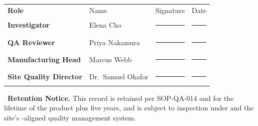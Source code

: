 \begin{center}
\begin{tabularx}{\linewidth}{@{}>{\bfseries}p{3.2cm} p{3.4cm} p{4.4cm} X@{}}
\rowcolor{meridiannavy}
{\color{white}Role} & {\color{white}Name} & {\color{white}Signature} & {\color{white}Date} \\
Investigator & Elena Cho & \rule{3.2cm}{0.4pt} & \rule{2cm}{0.4pt} \\
\rowcolor{meridianpaper}
QA Reviewer & Priya Nakamura & \rule{3.2cm}{0.4pt} & \rule{2cm}{0.4pt} \\
Manufacturing Head & Marcus Webb & \rule{3.2cm}{0.4pt} & \rule{2cm}{0.4pt} \\
\rowcolor{meridianpaper}
Site Quality Director & Dr.\ Samuel Okafor & \rule{3.2cm}{0.4pt} & \rule{2cm}{0.4pt} \\
\end{tabularx}
\end{center}

\vspace{6pt}

\begin{tcolorbox}[critbox]
\faLock\ \textbf{Retention Notice.} This record is retained per SOP-QA-014 and
\citet{cfr211} for the lifetime of the product plus five years, and is subject to
inspection under \citet{fda_deviation} and the site's \citet{iso9001}-aligned quality
management system.
\end{tcolorbox}



